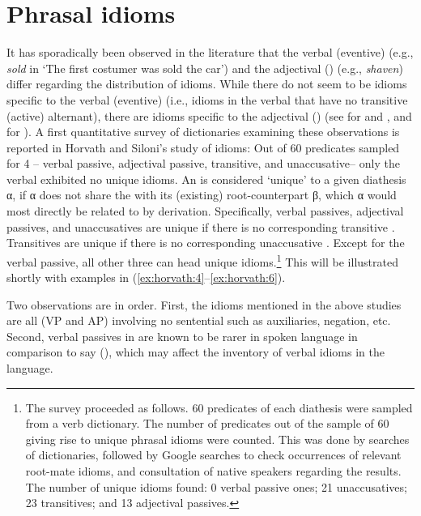 \documentclass[output=paper,
modfonts
]{LSP/langsci}
\begin{document}
\section{Phrasal idioms}\label{sec:horvath:2}

It has sporadically been observed in the literature that the verbal
(eventive)  (e.g., \emph{sold} in `The first costumer was sold
the car') and the adjectival ()  (e.g., \emph{shaven})
differ regarding the distribution of idioms. While there do not seem to
be idioms specific to the verbal (eventive)  (i.e., idioms in the
verbal  that have no transitive (active) alternant), there are
idioms specific to the adjectival ()  (see \citealt{ruwet1991} for
 and , and  \citealt{dubinsky1996} for ). A first
quantitative survey of  dictionaries examining these observations
is reported in Horvath and Siloni's \citeyear{horvath2009} study of  idioms: Out
of 60 predicates sampled for 4  -- verbal passive, adjectival
passive, transitive, and unaccusative-- only the verbal 
exhibited no unique idioms. An  is considered `unique' to a given
diathesis α, if α does not share the  with its (existing)
root-counterpart β, which α would most directly be related to by
derivation. Specifically, verbal passives, adjectival passives, and
unaccusatives are unique if there is no corresponding transitive .
Transitives are unique if there is no corresponding unaccusative .
Except for the verbal passive, all other three  can head unique
idioms.\footnote{The survey proceeded as follows. 60 predicates of each
  diathesis were sampled from a verb dictionary. The number of
  predicates out of the sample of 60 giving rise to unique phrasal
  idioms were counted. This was done by searches of  dictionaries,
  followed by Google searches to check occurrences of relevant root-mate
  idioms, and consultation of native speakers regarding the results. The
  number of unique idioms found: 0 verbal passive ones; 21
  unaccusatives; 23 transitives; and 13 adjectival passives.} This will
be illustrated shortly with  examples in (\ref{ex:horvath:4}--\ref{ex:horvath:6}).

Two observations are in order. First, the idioms mentioned in the above
studies are all  (VP and AP) involving no sentential
 such as auxiliaries, negation, etc. Second, verbal
passives in  are known to be rarer in spoken language in
comparison to say  (\citealt{berman2008}), which may affect the inventory
of verbal  idioms in the language.
\end{document}
